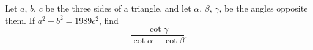 Let $a$, $b$, $c$ be the three sides of a triangle, and let $\alpha$, $\beta$, $\gamma$, be the angles opposite them. If $a^2+b^2=1989c^2$, find \[ \frac{\cot \gamma}{\cot \alpha+\cot \beta}. \]
